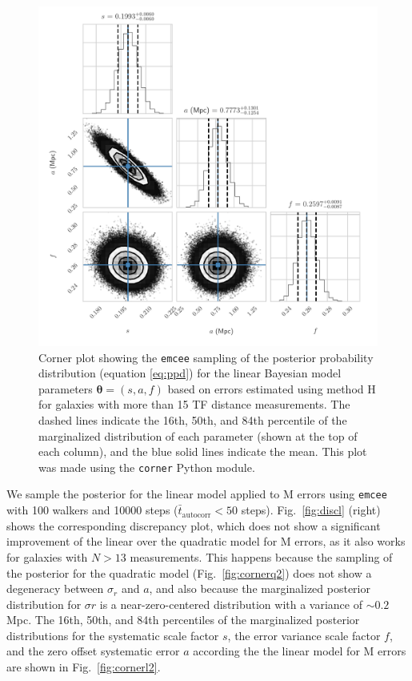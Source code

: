 \documentclass[a4paper,fleqn,usenatbib]{mnras}
\begin{document}
\begin{figure}
	\includegraphics[scale=0.69]{f16cornerl}
    \caption{Corner plot showing the \texttt{emcee} sampling of the posterior probability distribution (equation \ref{eq:ppd}) for the linear Bayesian model parameters $\pmb{\theta}=(s,a,f)$ based on errors estimated using method H for galaxies with more than 15 TF distance measurements. The dashed lines indicate the 16th, 50th, and 84th percentile of the marginalized distribution of each parameter (shown at the top of each column), and the blue solid lines indicate the mean. This plot was made using the \texttt{corner} Python module.}
    \label{fig:cornerl}
\end{figure}
We sample the posterior for the linear model applied to M errors using \texttt{emcee} with 100 walkers and 10000 steps ($\bar{t}_\mathrm{autocorr} < 50$ steps). Fig.~\ref{fig:discl} (right) shows the corresponding discrepancy plot, which does not show a significant improvement of the linear over the quadratic model for M errors, as it also works for galaxies with $N>13$ measurements. This happens because the sampling of the posterior for the quadratic model (Fig.~\ref{fig:cornerq2}) does not show a degeneracy between $\sigma_r$ and $a$, and also because the marginalized posterior distribution for $\sigma r$ is a near-zero-centered distribution with a variance of $\sim0.2$ Mpc. The 16th, 50th, and 84th percentiles of the marginalized posterior distributions for the systematic scale factor $s$, the error variance scale factor $f$, and the zero offset systematic error $a$ according the the linear model for M errors are shown in Fig.~\ref{fig:cornerl2}. 
\end{document}
